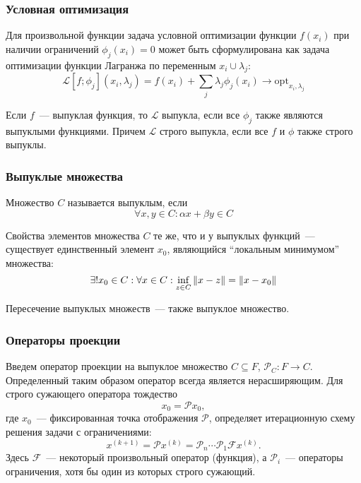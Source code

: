 \documentclass[compress]{beamer}
\begin{document}
    \begin{frame}\frametitle{Условная оптимизация}

        Для произвольной функции задача условной оптимизации функции $f(x_i)$ при наличии ограничений $\phi_j(x_i) = 0$ может быть сформулирована как задача оптимизации функции Лагранжа по переменным $x_i \cup \lambda_j$:
        \begin{equation*}
            \mathcal{L}[f;\phi_j](x_i,\lambda_j) =
                f(x_i) + \sum\limits_j \lambda_j \phi_j(x_i) \to \mathrm{opt}_{x_i,\lambda_j}
        \end{equation*}

        Если $f$~--- выпуклая функция, то $\mathcal{L}$ выпукла, если все $\phi_j$ также являются выпуклыми функциями. Причем $\mathcal{L}$ строго выпукла, если все $f$ и $\phi$ также строго выпуклы.

    \end{frame}

    \begin{frame}\frametitle{Выпуклые множества}

        Множество $C$ называется выпуклым, если
        \begin{equation*}
            \forall x,y \in C: \alpha x + \beta y \in C
        \end{equation*}

        Свойства элементов множества $C$ те же, что и у выпуклых функций~--- существует единственный элемент $x_0$, являющийся \enquote{локальным минимумом} множества:
        \begin{equation*}
            \exists! x_0 \in C : \forall x \in C: \inf\limits_{z \in C}{\norm{x - z}} = \norm{x - x_0}
        \end{equation*}

        Пересечение выпуклых множеств~--- также выпуклое множество.

    \end{frame}

    \begin{frame}\frametitle{Операторы проекции}

        Введем оператор проекции на выпуклое множество $C \subseteq F$, $\mathcal{P}_{C}: F \to C$. Определенный таким образом оператор всегда является нерасширяющим. Для строго сужающего оператора тождество
        \begin{equation*}
            x_0 = \mathcal{P} x_0,
        \end{equation*}
        где $x_0$~--- фиксированная точка отображения $\mathcal{P}$, определяет итерационную схему решения задачи с ограничениями:
        \begin{equation*}
            x^{(k+1)} = \mathcal{P} x^{(k)} = \mathcal{P}_n \cdots \mathcal{P}_1 \mathcal{F} x^{(k)} .
        \end{equation*}
        Здесь $\mathcal{F}$~--- некоторый произвольный оператор (функция), а $\mathcal{P}_i$~--- операторы ограничения, хотя бы один из которых строго сужающий.

    \end{frame}
\end{document}
